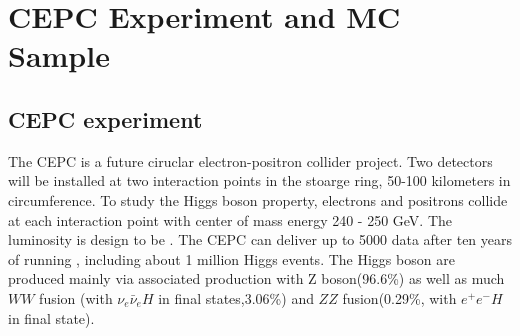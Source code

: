 \section{CEPC Experiment and MC Sample}
\label{sec:CEPC}
\subsection{CEPC experiment}
The CEPC is a future ciruclar electron-positron collider project. Two detectors will be installed at two interaction 
points in the stoarge ring, 50-100 kilometers in circumference. 
To study the Higgs boson property, electrons and positrons collide at each interaction point with center of mass energy 240 - 250 GeV. The luminosity is design to be  \lumiunit. 
The CEPC can deliver up to 5000 \ifb data after ten years of running , including about 1 million Higgs events.
 The Higgs boson are produced mainly via associated production with Z boson(96.6\%) as well as much $WW$ fusion (with $\nu_e\bar{\nu}_e H$ in final states,3.06\%) and $ZZ$ fusion(0.29\%, with $e^+e^-H$ in final state).
 

